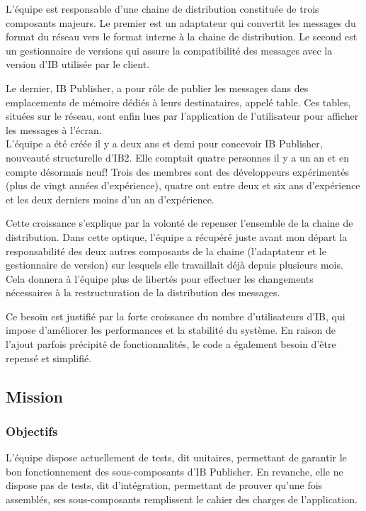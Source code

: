 \documentclass[11pt, oneside, titlepage, a4paper]{article}
\begin{document}
L'équipe est responsable d'une chaine de distribution constituée de trois composants majeurs. Le premier est un adaptateur qui convertit les messages du format du réseau vers le format interne à la chaine de distribution. Le second est un gestionnaire de versions qui assure la compatibilité des messages avec la version d'IB utilisée par le client.

Le dernier, IB Publisher, a pour rôle de publier les messages dans des emplacements de mémoire dédiés à leurs destinataires, appelé table. Ces tables, situées sur le réseau, sont enfin lues par l'application de l'utilisateur pour afficher les messages à l'écran.
\\

L'équipe a été créée il y a deux ans et demi pour concevoir IB Publisher, nouveauté structurelle d'IB2. Elle comptait quatre personnes il y a un an et en compte désormais neuf! Trois des membres sont des développeurs expérimentés (plus de vingt années d'expérience), quatre ont entre deux et six ans d'expérience et les deux derniers moins d'un an d'expérience.

Cette croissance s'explique par la volonté de repenser l'ensemble de la chaine de distribution. Dans cette optique, l'équipe a récupéré juste avant mon départ la responsabilité des deux autres composants de la chaine (l'adaptateur et le gestionnaire de version) sur lesquels elle travaillait déjà depuis plusieurs mois. Cela donnera à l'équipe plus de libertés pour effectuer les changements nécessaires à la restructuration de la distribution des messages.

Ce besoin est justifié par la forte croissance du nombre d'utilisateurs d'IB, qui impose d'améliorer les performances et la stabilité du système. En raison de l'ajout parfois précipité de fonctionnalités, le code a également besoin d'être repensé et simplifié.
	\subsection{Mission}
		\subsubsection{Objectifs}
L'équipe dispose actuellement de tests, dit unitaires, permettant de garantir le bon fonctionnement des sous-composants d'IB Publisher. En revanche, elle ne dispose pas de tests, dit d'intégration, permettant de prouver qu'une fois assemblés, ses sous-composants remplissent le cahier des charges de l'application.
\end{document}
